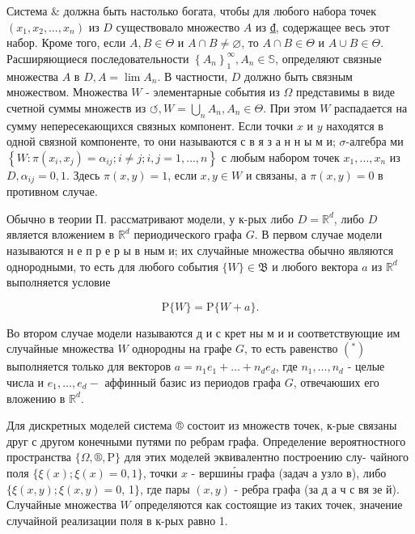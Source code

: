 \documentclass[10pt]{article}
\begin{document}
Система \& должна быть настолько богата, чтобы для любого набора точек $\left(x_{1}, x_{2}, \ldots, x_{n}\right)$ из $D$ существовало множество $A$ из $₫$, содержащее весь этот набор. Кроме того, если $A, B \in \Theta$ и $A \cap B \neq \varnothing$, то $A \cap B \in \Theta$ и $A \cup B \in \Theta$. Расширяющиеся последовательности $\left\{A_{n}\right\}_{1}^{\infty}, A_{n} \in \mathbb{S}$, определяют связные множества $A$ в $D, A=\lim A_{n}$. В частности, $D$ должно быть связным множеством. Множества $W$ - элементарные события из $\Omega$ представимы в виде счетной суммы множеств из $\circlearrowleft, W=\bigcup_{n} A_{n}, A_{n} \in \Theta$. При этом $W$ распадается на сумму непересекающихся связных компонент. Если точки $x$ и $y$ находятся в одной связной компоненте, то они называются с в я з а н н ы м и; $\sigma$-алгебра ми $\left\{W: \pi\left(x_{i}, x_{j}\right)=\alpha_{i j} ; i \neq j ; i, j=1, \ldots, n\right\}$ с любым набором точек $x_{1}, \ldots, x_{n}$ из $D, \alpha_{i j}=0,1$. Здесь $\pi(x, y)=1$, если $x, y \in W$ и связаны, а $\pi(x, y)=0$ в противном случае.



Обычно в теории П. рассматривают модели, у к-рых либо $D=\mathbb{R}^{d}$, либо $D$ является вложением в $\mathbb{R}^{d}$ периодического графа $G$. В первом случае модели называются н е п р е р ы в ным и; их случайные множества обычно являются однородными, то есть для любого события $\{W\} \in \mathfrak{B}$ и любого вектора $a$ из $\mathbb{R}^{d}$ выполняется условие



\[

\mathrm{P}\{W\}=\mathrm{P}\{W+a\} .

\]



Во втором случае модели называются д и с крет ны м и и соответствующие им случайные множества $W$ однородны на графе $G$, то есть равенство $\left({ }^{*}\right)$ выполняется только для векторов $a=n_{1} e_{1}+\ldots+n_{d} e_{d}$, где $n_{1}, \ldots, n_{d}$ - целые числа и $e_{1}, \ldots, e_{d}-$ аффинный базис из периодов графа $G$, отвечаюших его вложению в $\mathbb{R}^{d}$.



Для дискретных моделей система ® состоит из множеств точек, к-рые связаны друг с другом конечными путями по ребрам графа. Определение вероятностного пространства $\{\Omega, \mathfrak{\circledR}, \mathrm{P}\}$ для этих моделей эквивалентно построению слу- чайного поля $\{\xi(x) ; \xi(x)=0,1\}$, точки $x$ - вершин́ы графа (задач а узло в), либо $\{\xi(x, y) ; \xi(x, y)=0$, 1$\}$, где пары $(x, y)$ - ребра графа (за д а ч с вя зе й). Случайные множества $W$ определяются как состоящие из таких точек, значение случайной реализации поля в к-рых равно 1.
\end{document}
